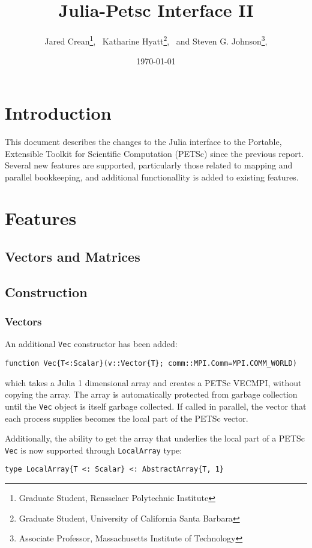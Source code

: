 \documentclass{article}
\title{Julia-Petsc Interface II}
\author{
  Jared Crean\thanks{Graduate Student, Rensselaer Polytechnic Institute}, \
  Katharine Hyatt\thanks{Graduate Student, University of California Santa Barbara}, \ and
  Steven G. Johnson\thanks{Associate Professor, Massachusetts Institute of Technology},
}
\date{\today}
\begin{document}
\maketitle

\section{Introduction} \label{sec:intro}
This document describes the changes to the Julia interface to the Portable, Extensible Toolkit for Scientific Computation (PETSc) since the previous report.
Several new features are supported, particularly those related to mapping 
and parallel bookkeeping, and additional functionallity is added to existing
features.



\section{Features} \label{sec:features}

\subsection{Vectors and Matrices} \label{sec:arrays}
\subsection{Construction}
\subsubsection{Vectors}
An additional \texttt{Vec} constructor has been added:
\begin{verbatim}
function Vec{T<:Scalar}(v::Vector{T}; comm::MPI.Comm=MPI.COMM_WORLD)
\end{verbatim}
\noindent which takes a Julia 1 dimensional array and creates a PETSc VECMPI, without
copying the array.  The array is automatically protected from garbage 
collection until the \texttt{Vec} object is itself garbage collected.
If called in parallel, the vector that each process supplies becomes the local
part of the PETSc vector.

Additionally, the ability to get the array that underlies the local part of
a PETSc \texttt{Vec} is now supported through \texttt{LocalArray} type:

\begin{verbatim}
type LocalArray{T <: Scalar} <: AbstractArray{T, 1}
\end{verbatim}
\end{document}
